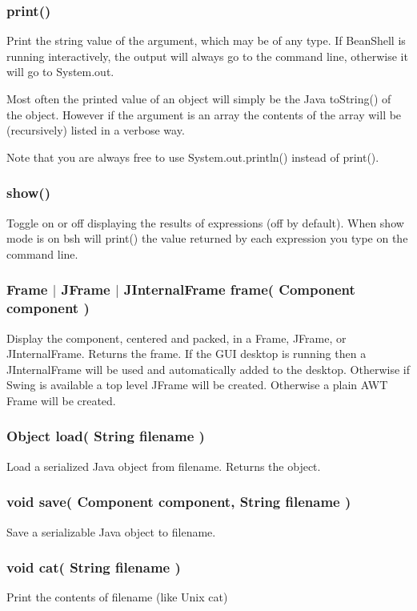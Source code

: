 \documentclass[twoside,11pt,nolof]{starlink}
\begin{document}
\subsubsection*{print()}
Print the string value of the argument, which may be of any type.
If BeanShell is running interactively, the output will always go to the
command line, otherwise it will go to System.out.

Most often the printed value of an object will simply be the Java
toString() of the object.  However if the argument is an array the contents
of the array will be (recursively) listed in a verbose way.

Note that you are always free to use System.out.println() instead of print().

\subsubsection*{show()}
Toggle on or off displaying the results of expressions (off by default).
When show mode is on bsh will print() the value returned by each expression
you type on the command line.

\subsubsection*{Frame $|$ JFrame $|$ JInternalFrame frame( Component component )}
Display the component, centered and packed, in a Frame, JFrame, or
JInternalFrame.  Returns the frame.  If the GUI desktop is running then a
JInternalFrame will be used and automatically added to the desktop.  Otherwise
if Swing is available a top level JFrame will be created.  Otherwise a plain
AWT Frame will be created.

\subsubsection*{Object load( String filename )}
Load a serialized Java object from filename.  Returns the object.

\subsubsection*{void save( Component component, String filename )}
Save a serializable Java object to filename.

\subsubsection*{void cat( String filename )}
Print the contents of filename (like Unix cat)
\end{document}
